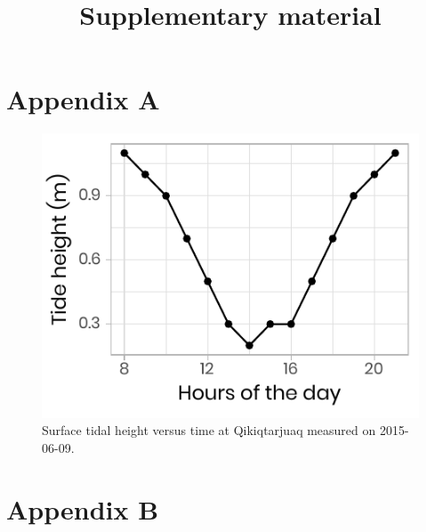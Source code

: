 \documentclass[12pt,a4paper]{scrartcl}
\title{Supplementary material}
\date{}
\begin{document}
\maketitle

\section*{Appendix A}



\renewcommand{\thefigure}{A\arabic{figure}}%
\renewcommand{\thetable}{A\arabic{table}}

\begin{figure}[h]
	\centering
	\includegraphics[scale = 1]{../../../graphs/supp_fig01.pdf}
	\caption{Surface tidal height versus time at Qikiqtarjuaq measured on 2015-06-09.}
\end{figure}

\clearpage
\newpage

\section*{Appendix B}

\renewcommand{\thefigure}{B\arabic{figure}}%
\renewcommand{\thetable}{B\arabic{table}}
\end{document}

